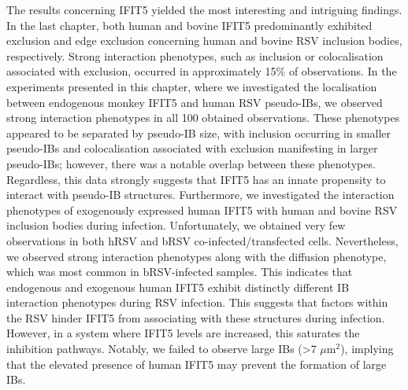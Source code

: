 The results concerning IFIT5 yielded the most interesting and intriguing findings. In the last chapter, both human and bovine IFIT5 predominantly exhibited exclusion and edge exclusion concerning human and bovine RSV inclusion bodies, respectively. Strong interaction phenotypes, such as inclusion or colocalisation associated with exclusion, occurred in approximately 15\% of observations. In the experiments presented in this chapter, where we investigated the localisation between endogenous monkey IFIT5 and human RSV pseudo-IBs, we observed strong interaction phenotypes in all 100 obtained observations. These phenotypes appeared to be separated by pseudo-IB size, with inclusion occurring in smaller pseudo-IBs and colocalisation associated with exclusion manifesting in larger pseudo-IBs; however, there was a notable overlap between these phenotypes. Regardless, this data strongly suggests that IFIT5 has an innate propensity to interact with pseudo-IB structures. Furthermore, we investigated the interaction phenotypes of exogenously expressed human IFIT5 with human and bovine RSV inclusion bodies during infection. Unfortunately, we obtained very few observations in both hRSV and bRSV co-infected/transfected cells. Nevertheless, we observed strong interaction phenotypes along with the diffusion phenotype, which was most common in bRSV-infected samples. This indicates that endogenous and exogenous human IFIT5 exhibit distinctly different IB interaction phenotypes during RSV infection. This suggests that factors within the RSV hinder IFIT5 from associating with these structures during infection. However, in a system where IFIT5 levels are increased, this saturates the inhibition pathways. Notably, we failed to observe large IBs (>7 \(\mu \mbox{m}^2\)), implying that the elevated presence of human IFIT5 may prevent the formation of large IBs.


